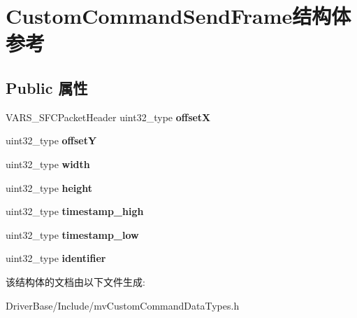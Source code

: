 \hypertarget{struct_custom_command_send_frame}{\section{Custom\+Command\+Send\+Frame结构体 参考}
\label{struct_custom_command_send_frame}
}
\subsection*{Public 属性}
\begin{DoxyCompactItemize}
\item 
\hypertarget{struct_custom_command_send_frame_aa9836d9e9f161ed4ac6256d3b7af6f36}{V\+A\+R\+S\+\_\+\+S\+F\+C\+Packet\+Header uint32\+\_\+type {\bfseries offset\+X}}\label{struct_custom_command_send_frame_aa9836d9e9f161ed4ac6256d3b7af6f36}

\item 
\hypertarget{struct_custom_command_send_frame_ada77858ace23d8f66a9c20f66b01fcd3}{uint32\+\_\+type {\bfseries offset\+Y}}\label{struct_custom_command_send_frame_ada77858ace23d8f66a9c20f66b01fcd3}

\item 
\hypertarget{struct_custom_command_send_frame_aaf5b70ab730761f930f4feb0b3c03177}{uint32\+\_\+type {\bfseries width}}\label{struct_custom_command_send_frame_aaf5b70ab730761f930f4feb0b3c03177}

\item 
\hypertarget{struct_custom_command_send_frame_a30e976dfe2b2dbb909675851e87f8b3b}{uint32\+\_\+type {\bfseries height}}\label{struct_custom_command_send_frame_a30e976dfe2b2dbb909675851e87f8b3b}

\item 
\hypertarget{struct_custom_command_send_frame_aab84689a5d5dfcf3c193bef720050ccc}{uint32\+\_\+type {\bfseries timestamp\+\_\+high}}\label{struct_custom_command_send_frame_aab84689a5d5dfcf3c193bef720050ccc}

\item 
\hypertarget{struct_custom_command_send_frame_abfed2043325a37a8aa4b6f846c717b0a}{uint32\+\_\+type {\bfseries timestamp\+\_\+low}}\label{struct_custom_command_send_frame_abfed2043325a37a8aa4b6f846c717b0a}

\item 
\hypertarget{struct_custom_command_send_frame_a851f4bf83aa0e591532111474d7fe82d}{uint32\+\_\+type {\bfseries identifier}}\label{struct_custom_command_send_frame_a851f4bf83aa0e591532111474d7fe82d}

\end{DoxyCompactItemize}


该结构体的文档由以下文件生成\+:\begin{DoxyCompactItemize}
\item 
Driver\+Base/\+Include/mv\+Custom\+Command\+Data\+Types.\+h\end{DoxyCompactItemize}
